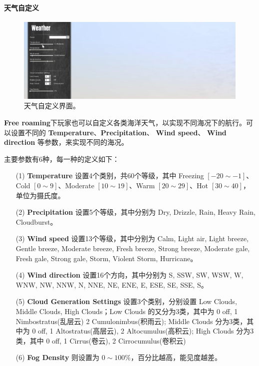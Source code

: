 \documentclass[letterpaper,10pt]{article}
\begin{document}
				\paragraph{天气自定义}
				
				\begin{figure}[htbp]
					\centering 
					\includegraphics[width=\columnwidth]{picture/Weather}
					\caption{
						\label{fig: Weather} 
						天气自定义界面。
					}	
				\end{figure}
				
				\textbf{Free roaming}下玩家也可以自定义各类海洋天气，以实现不同海况下的航行。可以设置不同的 \textbf{Temperature}、\textbf{Precipitation}、 \textbf{Wind speed}、 \textbf{Wind direction} 等参数，来实现不同的海况。
				
				
				主要参数有6种，每一种的定义如下：
				\begin{itemize}
					\item [(1)] 
					\textbf{Temperature} 设置4个类别，共60个等级，其中 Freezing $[-20 \sim -1]$、Cold $[0 \sim 9]$、Moderate $[10 \sim 19]$、Warm $[20 \sim 29]$、Hot $[30 \sim 40]$，单位为摄氏度。
					
					\item [(2)]
					\textbf{Precipitation} 设置5个等级，其中分别为 Dry, Drizzle, Rain, Heavy Rain, Cloudburst。
					
					\item [(3)]
					\textbf{Wind speed} 设置13个等级，其中分别为 Calm, Light air, Light breeze, Gentle breeze, Moderate breeze, Fresh breeze, Strong breeze, Moderate gale, Fresh gale, Strong gale, Storm, Violent Storm, Hurricane。
					
					\item [(4)]
					\textbf{Wind direction} 设置16个方向，其中分别为 S, SSW, SW, WSW, W, WNW, NW, NNW, N, NNE, NE, ENE, E, ESE, SE, SSE, S。
					
					\item [(5)]
					\textbf{Cloud Generation Settings} 设置3个类别，分别设置 Low Clouds, Middle Clouds, High Clouds；Low Clouds 的又分为3类，其中为 0 off, 1 Nimbostratus(乱层云) 2 Cumulonimbus(积雨云); Middle Clouds 分为3类，其中为 0 off, 1 Altostratus(高层云), 2 Altocumulus(高积云); High Clouds 分为3类，其中 0 off, 1 Cirrus(卷云), 2 Cirrocumulus(卷积云)
					
					\item [(6)]
					\textbf{Fog Density} 则设置为 $0 \sim 100\%$，百分比越高，能见度越差。
				\end{itemize}
	
\end{document}
